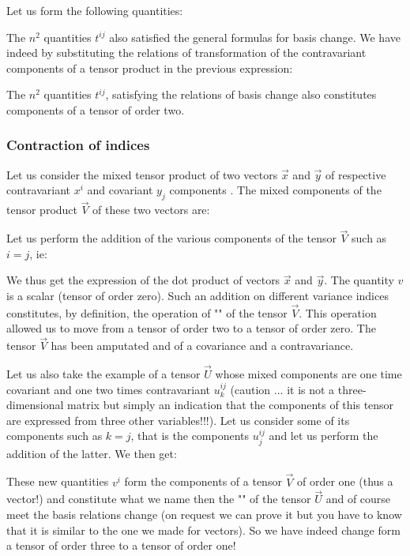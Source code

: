 	Let us form the following quantities:
	
	The $n^2$ quantities $t^{ij}$ also satisfied the general formulas for basis change. We have indeed by substituting the relations of transformation of the  contravariant components of a tensor product in the previous expression:
	
	The $n^2$ quantities $t^{ij}$, satisfying the relations of basis change also constitutes components of a tensor of order two.

	\subsubsection{Contraction of indices}
	Let us consider the mixed tensor product of two vectors $\vec{x}$ and $\vec{y}$ of respective contravariant $x^i$ and covariant $y_j$ components . The mixed components of the tensor product $\vec{V}$ of these two vectors are:
	
	Let us perform the addition of the various components of the tensor $\vec{V}$ such as $i=j$, ie:
	
	We thus get the expression of the dot product of vectors $\vec{x}$ and $\vec{y}$. The quantity $v$ is a scalar (tensor of order zero). Such an addition on different variance indices constitutes, by definition, the operation of "" of the tensor $\vec{V}$. This operation allowed us to move from a tensor of order two to a tensor of order zero. The tensor $\vec{V}$ has been amputated and of a covariance and a contravariance.
	
	Let us also take the example of a tensor $\vec{U}$ whose mixed components are one time covariant and one two times contravariant $u_k^{ij}$ (caution ... it is not a three-dimensional matrix but simply an indication that the components of this tensor are expressed from three other variables!!!). Let us consider some of its components such as $k=j$, that is the components $u_j^{ij}$ and let us perform the addition of the latter. We then get:
	
	These new quantities $v^i$ form the components of a tensor $\vec{V}$ of order one (thus a vector!) and constitute what we name then the "" of the tensor $\vec{U}$ and of course meet the basis relations change (on request we can prove it but you have to know that it is similar to the one we made for vectors). So we have indeed change form a tensor of order three to a tensor of order one!
	
